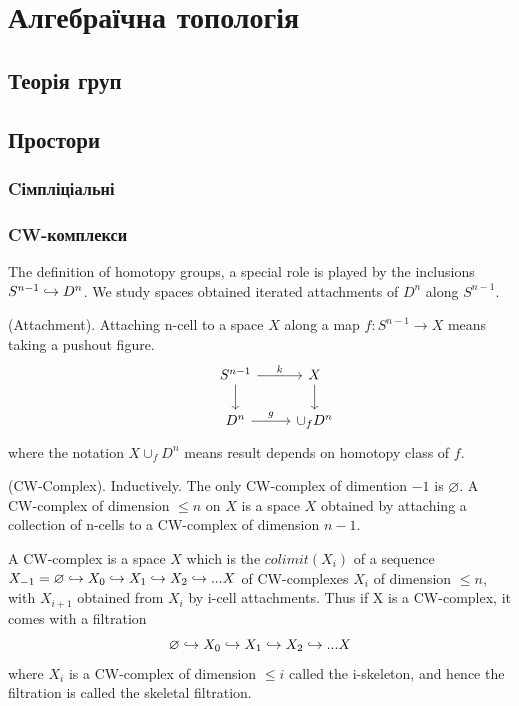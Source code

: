 \section{Алгебраїчна топологія}
\subsection{Теорія груп}
\subsection{Простори}
\subsubsection{Cімпліціальні}
\subsubsection{CW-комплекси}

The definition of homotopy groups, a special role is played
by the inclusions $S^{n-1} \hookrightarrow D^n$. We study spaces
obtained iterated attachments of $D^n$ along $S^{n-1}$.

\begin{definition} (Attachment).
Attaching n-cell to a space $X$
along a map $f : S^{n-1} \rightarrow X$ means taking a pushout figure.
$$
\begin{tikzcd}
 & S^{n-1} \arrow[r, "k"] \arrow[d, ""]
 & X \arrow[d, ""] \\
 & D^n \arrow[r, "g"] & \cup_f D^n
\end{tikzcd}
$$
where the notation $X \cup_f D^n$ means result depends
on homotopy class of $f$.
\end{definition}

\begin{definition} (CW-Complex).
Inductively. The only CW-complex of dimention $-1$ is $\varnothing$.
A CW-complex of dimension $\leqslant n$ on $X$ is a
space $X$ obtained by attaching a collection of n-cells
to a CW-complex of dimension $n-1$.

A CW-complex is a space $X$ which is the $colimit(X_i)$ of a
sequence $X_{-1} = \varnothing \hookrightarrow X_0 \hookrightarrow X_1 \hookrightarrow X_2 \hookrightarrow ... X$ of
CW-complexes $X_i$ of dimension $\leqslant n$, with $X_{i+1}$
obtained from $X_i$ by i-cell attachments.
Thus if X is a CW-complex, it comes with a filtration
$$
    \varnothing \hookrightarrow X_0 \hookrightarrow X_1 \hookrightarrow X_2 \hookrightarrow ... X
$$
where $X_i$ is a CW-complex of dimension $\leqslant i$ called
the i-skeleton, and hence the filtration is called the skeletal
filtration.
\end{definition}

